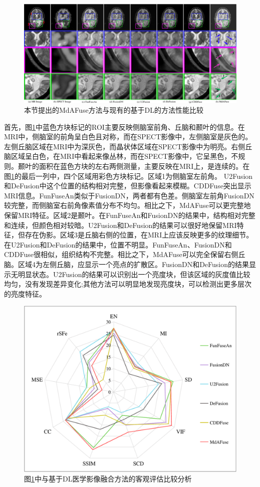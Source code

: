  \begin{figure}[ht]
      \centering
      \includegraphics[width=0.9\linewidth]{figs/paper2_29_1_roi2024.pdf}
      \caption{本节提出的MdAFuse方法与现有的基于DL的方法性能比较}\label{paper2029_1_roi}
    \end{figure}

首先，图\ref{paper2029_1_roi}中蓝色方块标记的ROI主要反映侧脑室前角、丘脑和颞叶的信息。在MRI中，侧脑室的前角呈白色且对称，而在SPECT影像中，左侧脑室是灰色的。左侧丘脑区域在MRI中为深灰色，而晶状体区域在SPECT影像中为明亮。右侧丘脑区域呈白色，在MRI中看起来像丛林，而在SPECT影像中，它呈黑色，不规则。颞叶的面积在蓝色方块的左右两侧测量，主要反映在MRI上，是连续的。在图\ref{paper2029_1_roi}的最后一列中，四个区域用彩色方块标记。区域1为侧脑室左前角。
U2Fusion和DeFusion中这个位置的结构相对完整，但影像看起来模糊。CDDFuse突出显示MRI信息。FunFuseAn类似于FusionDN，两者都有色差。侧脑室左前角FusionDN较完整，而侧脑室右前角像素值分布不均匀。相比之下，MdAFuse可以更完整地保留MRI特征。区域2是颞叶。在FunFuseAn和FusionDN的结果中，结构相对完整和连续，但颜色相对较暗。U2Fusion和DeFusion的结果可以很好地保留MRI特征，但存在伪影。区域3是丘脑右侧的位置，在MRI上应该反映更多的纹理细节。在U2Fusion和DeFusion的结果中，位置不明显。FunFuseAn、FusionDN和CDDFuse很相似，组织结构不完整。相比之下，MdAFuse可以完全保留右侧丘脑。区域4为左侧丘脑，应显示一个亮点的扩散区。FusionDN和DeFusion的结果显示无明显状态。U2Fusion的结果可以识别出一个亮度块，但该区域的灰度值比较均匀，没有发现差异变化;其他方法可以明显地发现亮度块，可以检测出更多层次的亮度特征。

   \begin{figure}[htb]
      \centering
      \includegraphics[width=0.9\linewidth]{figs/paper2DLMetrics2024.pdf}
      \caption{图\ref{paper2029_1_roi}中与基于DL医学影像融合方法的客观评估比较分析}\label{paper2029_1_roi_value}
    \end{figure}

